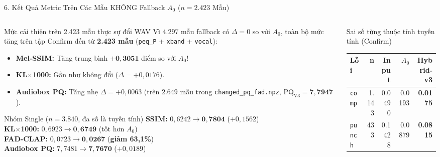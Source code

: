 \documentclass[aspectratio=169,10pt]{beamer}
\begin{document}
\begin{frame}{6. Kết Quả Metric Trên Các Mẫu KHÔNG Fallback $A_0$ ($n = 2.423$ Mẫu)}
  \begin{columns}[T]
    \begin{column}{0.48\textwidth}
      \scriptsize
      \begin{block}{Mức cải thiện trên 2.423 mẫu thực sự đổi WAV}
        Vì $4.297$ mẫu fallback có $\Delta = 0$ so với $A_0$, toàn bộ mức tăng trên tập Confirm đến từ \textbf{2.423 mẫu} (\texttt{peq\_P} + \texttt{xband} + \texttt{vocal}):
        \begin{itemize}
          \item \textbf{Mel-SSIM:} Tăng trung bình \textbf{$\mathbf{+0{,}3051}$} điểm so với $A_0$!
          \item \textbf{KL$\times$1000:} Gần như không đổi ($\Delta = +0{,}0176$).
          \item \textbf{Audiobox PQ:} Tăng nhẹ \textbf{$\Delta = +0{,}0063$} (trên $2.649$ mẫu trong \texttt{changed\_pq\_fad.npz}, $\text{PQ}_{\text{V3}} = \mathbf{7{,}7947}$).
        \end{itemize}
      \end{block}
      \begin{exampleblock}{Nhóm Single ($n=3.840$, đa số là tuyến tính)}
        \textbf{SSIM:} $0{,}6242 \rightarrow \mathbf{0{,}7804}$ ($+0{,}1562$)\\
        \textbf{KL$\times$1000:} $0{,}6923 \rightarrow \mathbf{0{,}6749}$ (tốt hơn $A_0$)\\
        \textbf{FAD-CLAP:} $0{,}0723 \rightarrow \mathbf{0{,}0267}$ (\textbf{giảm 63,1\%})\\
        \textbf{Audiobox PQ:} $7{,}7481 \rightarrow \mathbf{7{,}7670}$ ($+0{,}0189$)
      \end{exampleblock}
    \end{column}
    \begin{column}{0.49\textwidth}
      \scriptsize
      \begin{block}{Sai số từng thuộc tính tuyến tính (Confirm)}
        \centering
        \begin{tabular}{lrrrr}
          \toprule
          \textbf{Lỗi} & \textbf{n} & \textbf{Input} & \textbf{$A_0$} & \textbf{Hybrid-v3} \\
          \midrule
          \texttt{comp} & 1.143 & 0.0490 & 0.0193 & \textbf{0.0175} \\
          \texttt{punch} & 433 & 0.1428 & 0.0879 & \textbf{0.0815} \\

\end{tabular}
\end{block}
\end{column}
\end{columns}
\end{frame}
\end{document}
